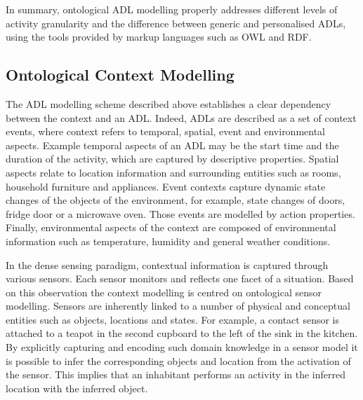 In summary, ontological ADL modelling properly addresses different levels of activity granularity and the difference between generic and personalised ADLs, using the tools provided by markup languages such as OWL and RDF. 

\subsection{Ontological Context Modelling}

The ADL modelling scheme described above establishes a clear dependency between the context and an ADL. Indeed, ADLs are described as a set of context events, where context refers to temporal, spatial, event and environmental aspects. Example temporal aspects of an ADL may be the start time and the duration of the activity, which are captured by descriptive properties. Spatial aspects relate to location information and surrounding entities such as rooms, household furniture and appliances. Event contexts capture dynamic state changes of the objects of the environment, for example, state changes of doors, fridge door or a microwave oven. Those events are modelled by action properties. Finally, environmental aspects of the context are composed of environmental information such as temperature, humidity and general weather conditions. 

In the dense sensing paradigm, contextual information is captured through various sensors. Each sensor monitors and reflects one facet of a situation. Based on this observation the context modelling is centred on ontological sensor modelling. Sensors are inherently linked to a number of physical and conceptual entities such as objects, locations and states. For example, a contact sensor is attached to a teapot in the second cupboard to the left of the sink in the kitchen. By explicitly capturing and encoding such domain knowledge in a sensor model it is possible to infer the corresponding objects and location from the activation of the sensor. This implies that an inhabitant performs an activity in the inferred location with the inferred object.

